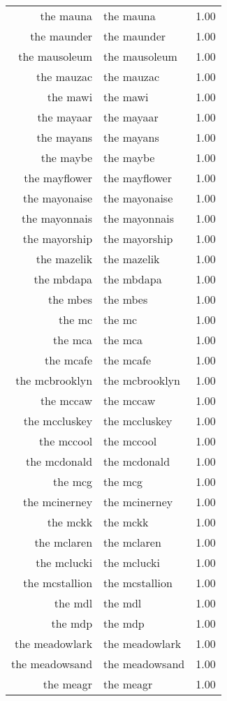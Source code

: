 \begin{table}[ht]
\begin{tabular}{rlr}
  the mauna & the mauna & 1.00 \\ 
  the maunder & the maunder & 1.00 \\ 
  the mausoleum & the mausoleum & 1.00 \\ 
  the mauzac & the mauzac & 1.00 \\ 
  the mawi & the mawi & 1.00 \\ 
  the mayaar & the mayaar & 1.00 \\ 
  the mayans & the mayans & 1.00 \\ 
  the maybe & the maybe & 1.00 \\ 
  the mayflower & the mayflower & 1.00 \\ 
  the mayonaise & the mayonaise & 1.00 \\ 
  the mayonnais & the mayonnais & 1.00 \\ 
  the mayorship & the mayorship & 1.00 \\ 
  the mazelik & the mazelik & 1.00 \\ 
  the mbdapa & the mbdapa & 1.00 \\ 
  the mbes & the mbes & 1.00 \\ 
  the mc & the mc & 1.00 \\ 
  the mca & the mca & 1.00 \\ 
  the mcafe & the mcafe & 1.00 \\ 
  the mcbrooklyn & the mcbrooklyn & 1.00 \\ 
  the mccaw & the mccaw & 1.00 \\ 
  the mccluskey & the mccluskey & 1.00 \\ 
  the mccool & the mccool & 1.00 \\ 
  the mcdonald & the mcdonald & 1.00 \\ 
  the mcg & the mcg & 1.00 \\ 
  the mcinerney & the mcinerney & 1.00 \\ 
  the mckk & the mckk & 1.00 \\ 
  the mclaren & the mclaren & 1.00 \\ 
  the mclucki & the mclucki & 1.00 \\ 
  the mcstallion & the mcstallion & 1.00 \\ 
  the mdl & the mdl & 1.00 \\ 
  the mdp & the mdp & 1.00 \\ 
  the meadowlark & the meadowlark & 1.00 \\ 
  the meadowsand & the meadowsand & 1.00 \\ 
  the meagr & the meagr & 1.00 \\ 

\end{tabular}
\end{table}
